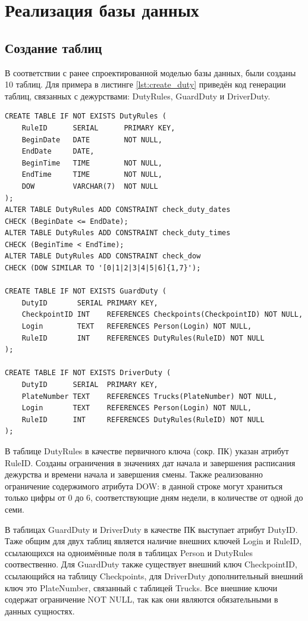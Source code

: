\section{Реализация базы данных}
\subsection{Создание таблиц}
В соответствии с ранее спроектированной моделью базы данных, были созданы 10 таблиц. Для примера в листинге \ref{lst:create_duty} приведён код генерации таблиц, связанных с дежурствами: DutyRules, GuardDuty и DriverDuty.

\begin{lstlisting}[caption = {Создание таблиц дежурств}, label=lst:create_duty]
CREATE TABLE IF NOT EXISTS DutyRules (
	RuleID		SERIAL		PRIMARY KEY,
	BeginDate	DATE		NOT NULL,
	EndDate		DATE,
	BeginTime	TIME		NOT NULL,
	EndTime		TIME		NOT NULL,
	DOW			VARCHAR(7)	NOT NULL
);
ALTER TABLE DutyRules ADD CONSTRAINT check_duty_dates
CHECK (BeginDate <= EndDate);
ALTER TABLE DutyRules ADD CONSTRAINT check_duty_times
CHECK (BeginTime < EndTime);
ALTER TABLE DutyRules ADD CONSTRAINT check_dow
CHECK (DOW SIMILAR TO '[0|1|2|3|4|5|6]{1,7}');

CREATE TABLE IF NOT EXISTS GuardDuty (
	DutyID 		 SERIAL	PRIMARY KEY,
	CheckpointID INT	REFERENCES Checkpoints(CheckpointID) NOT NULL,
	Login		 TEXT	REFERENCES Person(Login) NOT NULL,
	RuleID		 INT	REFERENCES DutyRules(RuleID) NOT NULL
);

CREATE TABLE IF NOT EXISTS DriverDuty (
	DutyID 		SERIAL	PRIMARY KEY,
	PlateNumber	TEXT	REFERENCES Trucks(PlateNumber) NOT NULL,
	Login		TEXT	REFERENCES Person(Login) NOT NULL,
	RuleID		INT		REFERENCES DutyRules(RuleID) NOT NULL
);
\end{lstlisting}

В таблице DutyRules в качестве первичного ключа (сокр. ПК) указан атрибут RuleID. Созданы ограничения в значениях дат начала и завершения расписания дежурства и времени начала и завершения смены. Также реализованно ограничение содержимого атрибута DOW: в данной строке могут храниться только цифры от 0 до 6, соответствующие дням недели, в количестве от одной до семи.

В таблицах GuardDuty и DriverDuty в качестве ПК выступает атрибут DutyID. Таже общим для двух таблиц является наличие внешних ключей Login и RuleID, ссылающихся на одноимённые поля в таблицах Person и DutyRules соотвественно. Для GuardDuty также существует внешний ключ CheckpointID, ссылающийся на таблицу Checkpoints, для DriverDuty дополнительный внешний ключ это PlateNumber, связанный с таблицей Trucks. Все внешние ключи содержат ограничение NOT NULL, так как они являются обязательными в данных сущностях.

